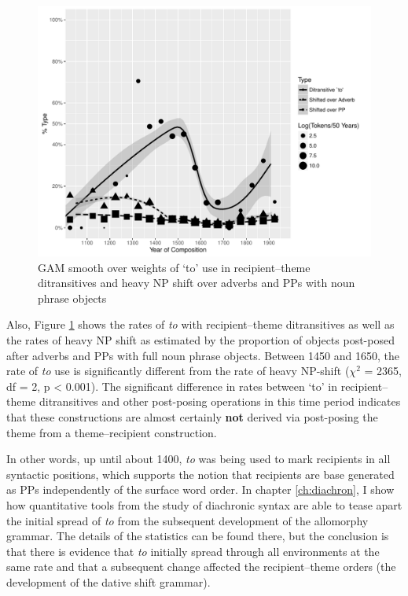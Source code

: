 \begin{figure}[t!]
	\includegraphics[width=\linewidth]{../images/shifting}
	\caption{GAM smooth over weights of `to' use in recipient--theme ditransitives and heavy NP shift over adverbs and PPs with noun phrase objects}
	\label{fig:shifting}
\end{figure}

Also, Figure \ref{fig:shifting} shows the rates of \textit{to} with recipient--theme ditransitives as well as the rates of heavy NP shift as estimated by the proportion of objects post-posed after adverbs and PPs with full noun phrase objects. Between 1450 and 1650, the rate of \textit{to} use is significantly different from the rate of heavy NP-shift ($\chi^2$ =  2365, df = 2, p < 0.001). The significant difference in rates between `to' in recipient--theme ditransitives and other post-posing operations in this time period indicates that these constructions are almost certainly \textbf{not} derived via post-posing the theme from a theme--recipient construction.

In other words, up until about 1400, \textit{to} was being used to mark recipients in all syntactic positions, which supports the notion that recipients are base generated as PPs independently of the surface word order. In chapter \ref{ch:diachron}, I show how quantitative tools from the study of diachronic syntax are able to tease apart the initial spread of \textit{to} from the subsequent development of the allomorphy grammar. The details of the statistics can be found there, but the conclusion is that there is evidence that \textit{to} initially spread through all environments at the same rate and that a subsequent change affected the recipient--theme orders (the development of the dative shift grammar).

